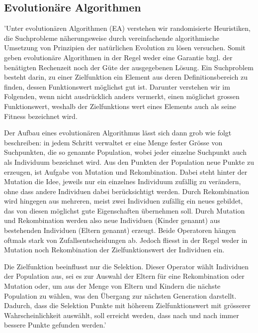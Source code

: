 \subsection{Evolutionäre Algorithmen}
'Unter evolutionären Algorithmen (EA) verstehen wir randomisierte Heuristiken, die Suchprobleme näherungsweise durch vereinfachende algorithmische Umsetzung von
Prinzipien der natürlichen Evolution zu lösen versuchen. Somit geben evolutionäre Algorithmen in der Regel weder eine Garantie bzgl. der benätigten Rechenzeit noch der Güte der ausgegebenen Lösung. Ein Suchproblem besteht darin, zu einer Zielfunktion ein Element aus deren Definitionsbereich zu finden, dessen Funktionswert möglichst gut ist. Darunter verstehen wir im Folgenden, wenn nicht ausdrücklich anders vermerkt, einen möglichst grossen Funktionswert, weshalb der Zielfunktions wert eines Elements auch als seine Fitness bezeichnet wird.

Der Aufbau eines evolutionären Algorithmus lässt sich dann grob wie folgt beschreiben: in jedem Schritt verwaltet er eine Menge fester Grösse von Suchpunkten, die so genannte Population, wobei jeder einzelne Suchpunkt auch als Individuum bezeichnet wird. Aus den Punkten der Population neue Punkte zu erzeugen, ist Aufgabe von Mutation und Rekombination. Dabei steht hinter der Mutation die Idee, jeweils nur ein einzelnes Individuum zufällig zu verändern, ohne dass andere Individuen dabei berücksichtigt werden. Durch Rekombination wird hingegen aus mehreren, meist zwei Individuen zufällig ein neues gebildet, das von diesen möglichst gute Eigenschaften übernehmen soll. Durch Mutation und Rekombination werden also neue Individuen (Kinder genannt) aus bestehenden Individuen (Eltern genannt) erzeugt. Beide Operatoren hängen oftmals stark von Zufallsentscheidungen ab. Jedoch fliesst in der Regel weder in Mutation noch Rekombination der Zielfunktionswert der Individuen ein.

Die Zielfunktion beeinflusst nur die Selektion. Dieser Operator wählt Individuen der Population aus, sei es zur Auswahl der Eltern für eine Rekombination oder Mutation oder, um aus der Menge von Eltern und Kindern die nächste Population zu wählen, was den Übergang zur nächsten Generation darstellt. Dadurch, dass die Selektion Punkte mit höherem Zielfunktionswert mit grösserer Wahrscheinlichkeit auswählt, soll erreicht werden, dass nach und nach immer bessere Punkte gefunden werden.' \cite{droste}

